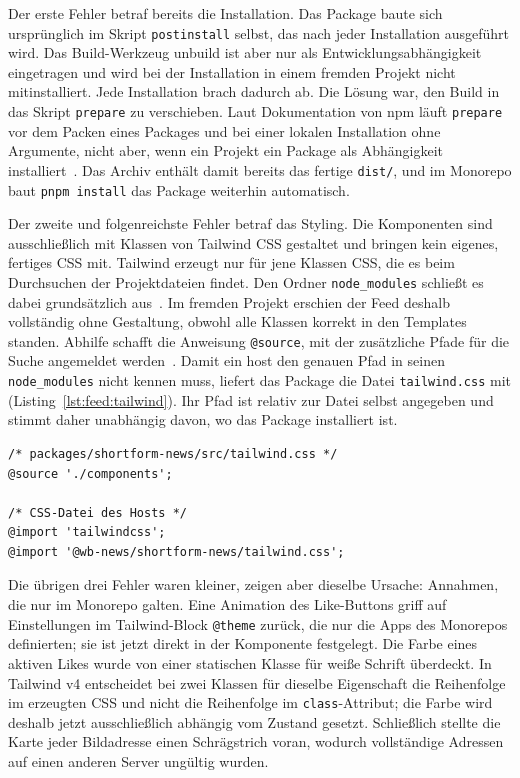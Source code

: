 Der erste Fehler betraf bereits die Installation.
Das Package baute sich ursprünglich im Skript \texttt{postinstall} selbst, das nach jeder Installation ausgeführt wird.
Das Build-Werkzeug unbuild ist aber nur als Entwicklungsabhängigkeit eingetragen und wird bei der Installation in einem fremden Projekt nicht mitinstalliert.
Jede Installation brach dadurch ab.
Die Lösung war, den Build in das Skript \texttt{prepare} zu verschieben.
Laut Dokumentation von npm läuft \texttt{prepare} vor dem Packen eines Packages und bei einer lokalen Installation ohne Argumente, nicht aber, wenn ein Projekt ein Package als Abhängigkeit installiert~\cite{npmscripts}.
Das Archiv enthält damit bereits das fertige \texttt{dist/}, und im Monorepo baut \texttt{pnpm install} das Package weiterhin automatisch.

Der zweite und folgenreichste Fehler betraf das Styling.
Die Komponenten sind ausschließlich mit Klassen von Tailwind CSS gestaltet und bringen kein eigenes, fertiges CSS mit.
Tailwind erzeugt nur für jene Klassen CSS, die es beim Durchsuchen der Projektdateien findet.
Den Ordner \texttt{node\_modules} schließt es dabei grundsätzlich aus~\cite{tailwindsources}.
Im fremden Projekt erschien der Feed deshalb vollständig ohne Gestaltung, obwohl alle Klassen korrekt in den Templates standen.
Abhilfe schafft die Anweisung \texttt{@source}, mit der zusätzliche Pfade für die Suche angemeldet werden~\cite{tailwindsources}.
Damit ein \gls{host} den genauen Pfad in seinen \texttt{node\_modules} nicht kennen muss, liefert das Package die Datei \texttt{tailwind.css} mit (Listing~\ref{lst:feed:tailwind}).
Ihr Pfad ist relativ zur Datei selbst angegeben und stimmt daher unabhängig davon, wo das Package installiert ist.

\begin{lstlisting}[float=tbp,language={},caption={Die mitgelieferte Datei \texttt{tailwind.css} und ihre Verwendung im Host},label=lst:feed:tailwind]
/* packages/shortform-news/src/tailwind.css */
@source './components';

/* CSS-Datei des Hosts */
@import 'tailwindcss';
@import '@wb-news/shortform-news/tailwind.css';
\end{lstlisting}

Die übrigen drei Fehler waren kleiner, zeigen aber dieselbe Ursache: Annahmen, die nur im Monorepo galten.
Eine Animation des Like-Buttons griff auf Einstellungen im Tailwind-Block \texttt{@theme} zurück, die nur die Apps des Monorepos definierten; sie ist jetzt direkt in der Komponente festgelegt.
Die Farbe eines aktiven Likes wurde von einer statischen Klasse für weiße Schrift überdeckt.
In Tailwind v4 entscheidet bei zwei Klassen für dieselbe Eigenschaft die Reihenfolge im erzeugten CSS und nicht die Reihenfolge im \texttt{class}-Attribut; die Farbe wird deshalb jetzt ausschließlich abhängig vom Zustand gesetzt.
Schließlich stellte die Karte jeder Bildadresse einen Schrägstrich voran, wodurch vollständige Adressen auf einen anderen Server ungültig wurden.

